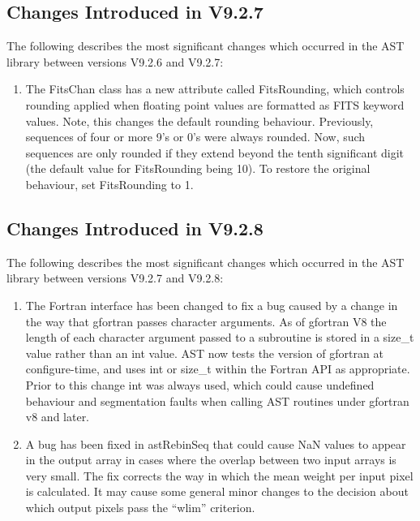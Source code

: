 \documentclass[twoside,11pt]{starlink}
\begin{document}
\subsection{Changes Introduced in V9.2.7}
The following describes the most significant changes which
occurred in the AST library between versions V9.2.6 and V9.2.7:

\begin{enumerate}

\item The FitsChan class has a new attribute called FitsRounding, which
controls rounding applied when floating point values are formatted as
FITS keyword values. Note, this changes the default rounding behaviour.
Previously, sequences of four or more 9's or 0's were always rounded.
Now, such sequences are only rounded if they extend beyond the tenth
significant digit (the default value for FitsRounding being 10). To
restore the original behaviour, set FitsRounding to 1.

\end{enumerate}

\subsection{Changes Introduced in V9.2.8}
The following describes the most significant changes which
occurred in the AST library between versions V9.2.7 and V9.2.8:

\begin{enumerate}

\item  The Fortran interface has been changed to fix a bug caused by a
change in the way that gfortran passes character arguments. As of gfortran
V8 the length of each character argument passed to a subroutine is stored in a
size\_t value rather than an int value. AST now tests the version of
gfortran at configure-time, and uses int or size\_t within the Fortran
API as appropriate. Prior to this change int was always used, which could
cause undefined behaviour and segmentation faults when calling AST
routines under gfortran v8 and later.

\item  A bug has been fixed in astRebinSeq that could cause NaN values to
appear in the output array in cases where the overlap between two
input arrays is very small.  The fix corrects the way in which the mean
weight per input pixel is calculated. It may cause some general minor
changes to the decision about which output pixels pass the ``wlim''
criterion.

\end{enumerate}
\end{document}

